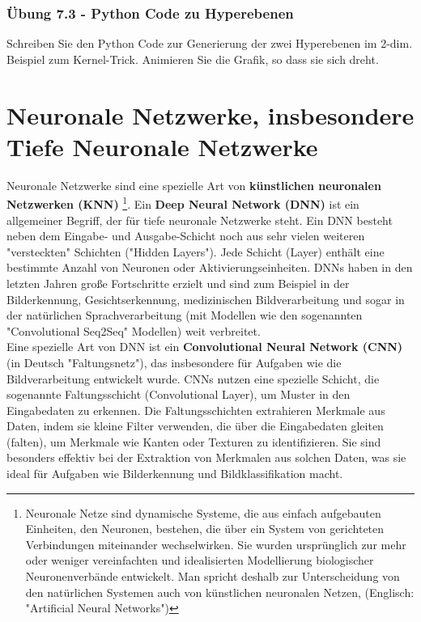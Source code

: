 \documentclass[12pt]{article}
\begin{document}
\subsubsection{Übung 7.3 - Python Code zu Hyperebenen}
Schreiben Sie den Python Code zur Generierung der zwei Hyperebenen im 2-dim. Beispiel zum Kernel-Trick. Animieren Sie die Grafik, so dass sie sich dreht. 

\newpage

\section{Neuronale Netzwerke, insbesondere Tiefe Neuronale Netzwerke }

Neuronale Netzwerke sind eine spezielle Art von \textbf{künstlichen neuronalen Netzwerken (KNN)}  \footnote{Neuronale Netze sind dynamische Systeme, die aus einfach aufgebauten Einheiten, den Neuronen, bestehen, die über ein System von gerichteten Verbindungen miteinander wechselwirken. Sie wurden ursprünglich zur mehr oder weniger vereinfachten und idealisierten Modellierung biologischer Neuronenverbände entwickelt. Man spricht deshalb zur Unterscheidung von den natürlichen Systemen auch von künstlichen neuronalen Netzen, (Englisch: "Artificial Neural Networks")}.
Ein \textbf{Deep Neural Network (DNN)} ist ein allgemeiner Begriff, der für tiefe neuronale Netzwerke steht. Ein DNN besteht neben dem Eingabe- und Ausgabe-Schicht noch aus sehr vielen weiteren "versteckten" Schichten ("Hidden Layers"). Jede Schicht (Layer) enthält eine bestimmte Anzahl von Neuronen oder Aktivierungseinheiten. DNNs haben in den letzten Jahren große Fortschritte erzielt und sind zum Beispiel in der Bilderkennung, Gesichtserkennung, medizinischen Bildverarbeitung und sogar in der natürlichen Sprachverarbeitung (mit Modellen wie den sogenannten "Convolutional Seq2Seq" Modellen) weit verbreitet.\\
Eine spezielle Art von DNN ist ein \textbf{Convolutional Neural Network (CNN)}  (in Deutsch "Faltungsnetz"), das insbesondere für Aufgaben wie die Bildverarbeitung entwickelt wurde. CNNs nutzen eine spezielle Schicht, die sogenannte Faltungsschicht (Convolutional Layer), um Muster in den Eingabedaten zu erkennen. Die Faltungsschichten extrahieren Merkmale aus Daten, indem sie kleine Filter verwenden, die über die Eingabedaten gleiten (falten), um Merkmale wie Kanten oder Texturen zu identifizieren. Sie sind besonders effektiv bei der Extraktion von Merkmalen aus solchen Daten, was sie ideal für Aufgaben wie Bilderkennung und Bildklassifikation macht.%
\end{document}
